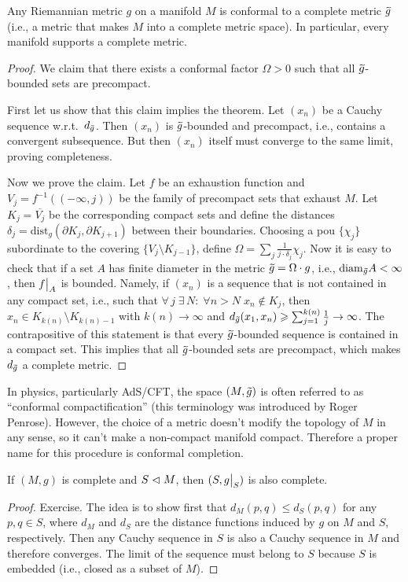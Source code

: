 \begin{thm}
    Any Riemannian metric $g$ on a manifold $M$ is conformal to a complete metric $\wt{g}$ (i.e., a metric that makes $M$ into a complete metric space). In particular, every manifold supports a complete metric.
\end{thm}
\begin{proof}
    We claim that there exists a conformal factor $\Omega>0$ such that all $\wt{g}$-bounded sets are precompact.

    First let us show that this claim implies the theorem. Let $(x_n)$ be a Cauchy sequence w.r.t.\ $d_{\wt{g}}$. Then $(x_n)$ is $\wt{g}$-bounded and precompact, i.e., contains a convergent subsequence. But then $(x_n)$ itself must converge to the same limit, proving completeness.

    Now we prove the claim. Let $f$ be an exhaustion function and $V_j=f^{-1}((-\infty,j))$ be the family of precompact sets that exhaust $M$. Let $K_j=\overline{V_j}$ be the corresponding compact sets and define the distances $\delta_j=\mathrm{dist}_g(\partial K_j,\partial K_{j+1})$ between their boundaries. Choosing a \gls{pou} $\{\chi_j\}$ subordinate to the covering $\{V_{j}\setminus K_{j-1}\}$, define $\Omega=\sum_j \frac{1}{j\cdot \delta_j} \chi_j$. Now it is easy to check that if a set $A$ has finite diameter in the metric $\wt{g}=\Omega\cdot g$, i.e., $\mathrm{diam}_{\wt{g}} A<\infty$, then $\restr{f}{A}$ is bounded. Namely, if $(x_n)$ is a sequence that is not contained in any compact set, i.e., such that $\forall\,j \;\exists\, N:\;\forall n>N \;x_n\notin K_j$, then $x_n\in K_{k(n)}\setminus K_{k(n)-1}$ with $k(n)\to\infty$ and  $d_{\wt{g}}(x_1,x_n)\geq\sum_{j=1}^{k(n)} \frac{1}{j}\to\infty$. The contrapositive of this statement is that every $\wt{g}$-bounded sequence is contained in a compact set. This implies that all $\wt{g}$-bounded sets are precompact, which makes $d_{\wt{g}}$ a complete metric.
\end{proof}
\begin{rem}
    In physics, particularly AdS/CFT, the space $(M,\wt{g})$ is often referred to as ``conformal compactification'' (this terminology was introduced by Roger Penrose). However, the choice of a metric doesn't modify the topology of $M$ in any sense, so it can't make a non-compact manifold compact. Therefore a proper name for this procedure is conformal completion.
\end{rem}

\begin{prop}
    If $(M,g)$ is complete and $S\vartriangleleft M$, then $(S,\restr{g}{S})$ is also complete.
\end{prop}
\begin{proof}
    Exercise. The idea is to show first that $d_M(p,q)\leq d_S(p,q)$ for any $p,q\in S$, where $d_M$ and $d_S$ are the distance functions induced by $g$ on $M$ and $S$, respectively. Then any Cauchy sequence in $S$ is also a Cauchy sequence in $M$ and therefore converges. The limit of the sequence must belong to $S$ because $S$ is embedded (i.e., closed as a subset of $M$).
\end{proof}

